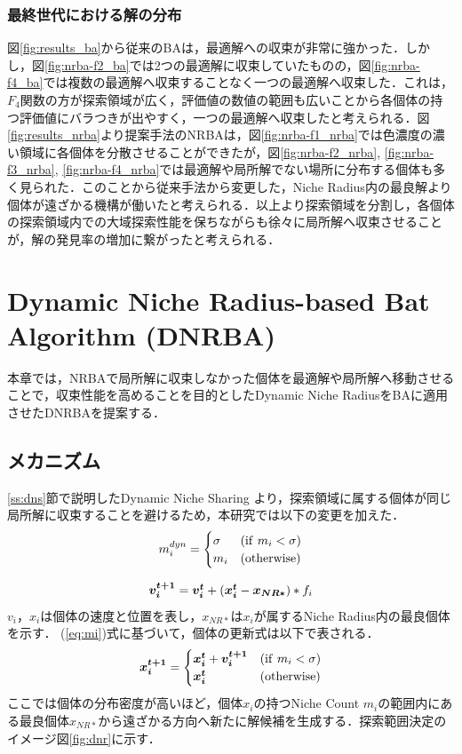 \documentclass[a4j,11pt]{jarticle}
\begin{document}
\subsubsection{最終世代における解の分布}
\label{sss:dstr_sol} 
図\ref{fig:results_ba}から従来のBAは，最適解への収束が非常に強かった．しかし，図\ref{fig:nrba-f2_ba}では2つの最適解に収束していたものの，図\ref{fig:nrba-f4_ba}では複数の最適解へ収束することなく一つの最適解へ収束した．これは，$F_4$関数の方が探索領域が広く，評価値の数値の範囲も広いことから各個体の持つ評価値にバラつきが出やすく，一つの最適解へ収束したと考えられる．図\ref{fig:results_nrba}より提案手法のNRBAは，図\ref{fig:nrba-f1_nrba}では色濃度の濃い領域に各個体を分散させることができたが，図\ref{fig:nrba-f2_nrba}, \ref{fig:nrba-f3_nrba}, \ref{fig:nrba-f4_nrba}では最適解や局所解でない場所に分布する個体も多く見られた．このことから従来手法から変更した，Niche Radius内の最良解より個体が遠ざかる機構が働いたと考えられる．以上より探索領域を分割し，各個体の探索領域内での大域探索性能を保ちながらも徐々に局所解へ収束させることが，解の発見率の増加に繋がったと考えられる．


\clearpage
\newpage
\section{Dynamic Niche Radius-based Bat Algorithm (DNRBA)}
\label{sec:DNRBA}
本章では，NRBAで局所解に収束しなかった個体を最適解や局所解へ移動させることで，収束性能を高めることを目的としたDynamic Niche RadiusをBAに適用させたDNRBAを提案する．
\subsection{メカニズム}
\label{ss:DNRBA-abst}
\ref{ss:dns}節で説明したDynamic Niche Sharing \cite{DNS} より，探索領域に属する個体が同じ局所解に収束することを避けるため，本研究では以下の変更を加えた．
\begin{equation}
\label{eq:mi}
m_i^{dyn}=\begin{cases}
\sigma & ({\rm if } \ m_i < \sigma) \\
m_i & ({\rm otherwise})
\end{cases}
\end{equation}

\begin{equation}
\label{eq:dnrba-vi}
 \mbox{\boldmath $v_i^{t+1}$} = \mbox{\boldmath $v_i^t$} + (\mbox{\boldmath $x_i^t$}-\mbox{\boldmath $x_{NR*}$})*f_i
\end{equation}
$v_i$，$x_i$は個体の速度と位置を表し，$x_{NR*}$は$x_i$が属するNiche Radius内の最良個体を示す．
(\ref{eq:mi})式に基づいて，個体の更新式は以下で表される．
\begin{equation}
\label{eq:dnrba-xi}
\mbox{\boldmath $x_i^{t+1}$}=\begin{cases}
\mbox{\boldmath $x_i^t$}+\mbox{\boldmath $v_i^{t+1}$} & ({\rm if} \ m_i < \sigma) \\
\mbox{\boldmath $x_i^t$} & ({\rm otherwise})
\end{cases}
\end{equation}
ここでは個体の分布密度が高いほど，個体$x_i$の持つNiche Count $m_i$の範囲内にある最良個体$x_{NR*}$から遠ざかる方向へ新たに解候補を生成する．探索範囲決定のイメージ図\ref{fig:dnr}に示す．
\end{document}
